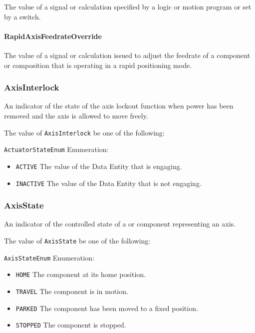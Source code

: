 The value of a signal or calculation specified by a logic or motion program or set by a switch.


\paragraph{RapidAxisFeedrateOverride}\mbox{}
\label{sec:RapidAxisFeedrateOverride}


The value of a signal or calculation issued to adjust the feedrate of a component or composition that is operating in a rapid positioning mode.


\subsubsection{AxisInterlock}
\label{sec:AxisInterlock}



An indicator of the state of the axis lockout function when power has been removed and the axis is allowed to move freely.


The value of \texttt{AxisInterlock} \MUST be one of the following: 


\texttt{ActuatorStateEnum} Enumeration:

\begin{itemize}
\item \texttt{ACTIVE} \newline The value of the \gls{Data Entity} that is engaging. 
\item \texttt{INACTIVE} \newline The value of the \gls{Data Entity} that is not engaging. 
\end{itemize}

\FloatBarrier

\subsubsection{AxisState}
\label{sec:AxisState}



An indicator of the controlled state of a  or  component representing an axis.


The value of \texttt{AxisState} \MUST be one of the following: 


\texttt{AxisStateEnum} Enumeration:

\begin{itemize}
\item \texttt{HOME} \newline The component at its home position. 
\item \texttt{TRAVEL} \newline The component is in motion. 
\item \texttt{PARKED} \newline The component has been moved to a fixed position. 
\item \texttt{STOPPED} \newline The component is stopped. 
\end{itemize}

